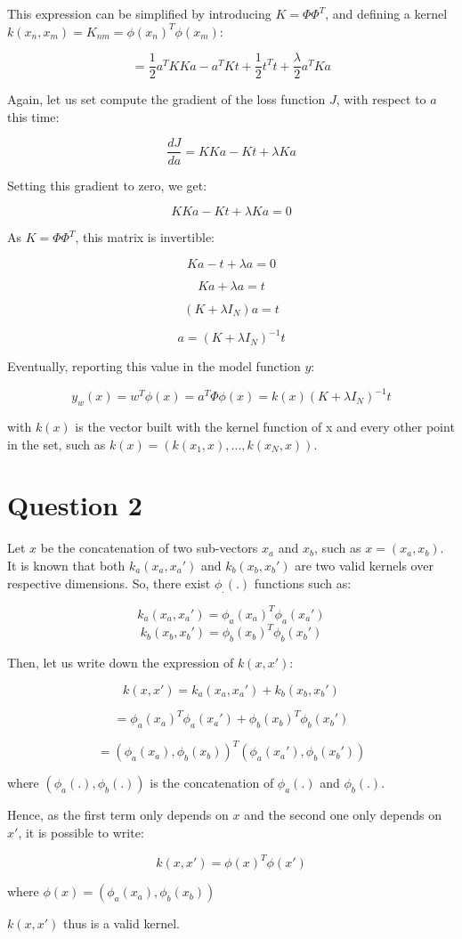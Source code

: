 \documentclass{article}
\begin{document}
This expression can be simplified by introducing $K = \Phi\Phi^T$, and defining a kernel $k(x_n,x_m) = K_{nm} = \phi(x_n)^T \phi(x_m)$:

$$ = \frac{1}{2}a^T K K a - a^T K t + \frac{1}{2}t^T t + \frac{\lambda}{2} a^T K a$$

Again, let us set compute the gradient of the loss function $J$, with respect to $a$ this time:

$$ \frac{dJ}{da} = K K a - K t + \lambda K a$$

Setting this gradient to zero, we get:

$$ K K a - K t + \lambda K a = 0 $$

As $K = \Phi\Phi^T$, this matrix is invertible:

$$ K a - t + \lambda a = 0 $$

$$ K a + \lambda a = t $$

$$ (K + \lambda I_N)a = t $$

$$ a = (K + \lambda I_N)^{-1}t $$

Eventually, reporting this value in the model function $y$:

$$ y_w(x) = w^T \phi(x) = a^T \Phi \phi(x) = k(x) (K + \lambda I_N)^{-1}t$$

with $k(x)$ is the vector built with the kernel function of x and every other point in the set, such as $k(x) = (k(x_1,x), ..., k(x_N,x))$.


\section*{Question 2}

Let $x$ be the concatenation of two sub-vectors $x_a$ and $x_b$, such as $x = (x_a,x_b)$. It is known that both $k_a(x_a,x_a')$ and $k_b(x_b,x_b')$ are two valid kernels over respective dimensions. So, there exist $\phi_.(.)$ functions such as:

$$ k_a(x_a,x_a') = \phi_a(x_a)^T \phi_a(x_a') $$
$$ k_b(x_b,x_b') = \phi_b(x_b)^T \phi_b(x_b') $$

Then, let us write down the expression of $k(x,x')$:

$$ k(x,x') = k_a(x_a,x_a') + k_b(x_b,x_b') $$

$$ = \phi_a(x_a)^T \phi_a(x_a') + \phi_b(x_b)^T \phi_b(x_b') $$

$$ = (\phi_a(x_a),\phi_b(x_b))^T (\phi_a(x_a'),\phi_b(x_b'))$$

where $(\phi_a(.),\phi_b(.))$ is the concatenation of $\phi_a(.)$ and $\phi_b(.)$.

Hence, as the first term only depends on $x$ and the second one only depends on $x'$, it is possible to write:

$$ k(x,x') = \phi(x)^T \phi(x') $$

where $\phi(x) = (\phi_a(x_a),\phi_b(x_b)) $

$k(x,x')$ thus is a valid kernel.
\end{document}
